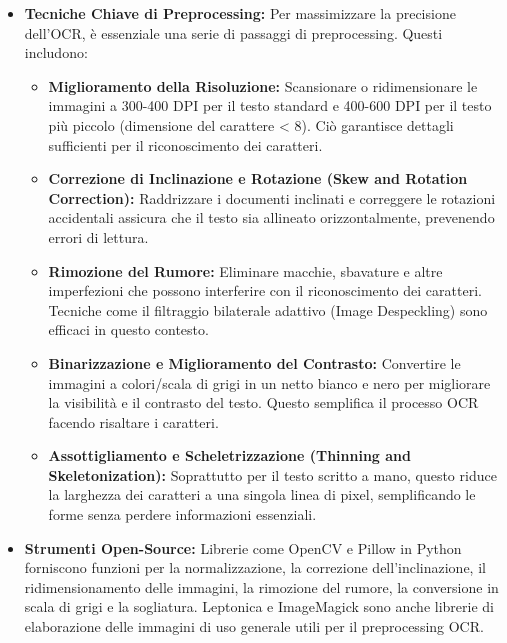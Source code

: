 \documentclass[a4paper, 11pt]{article}
\begin{document}
\begin{itemize}
   \item \textbf{Tecniche Chiave di Preprocessing:} Per massimizzare la precisione dell'OCR, è essenziale una serie di passaggi di preprocessing. Questi includono:
   \begin{itemize}
        \item \textbf{Miglioramento della Risoluzione:} Scansionare o ridimensionare le immagini a 300-400 DPI per il testo standard e 400-600 DPI per il testo più piccolo (dimensione del carattere < 8). \cite{ocr_best_practices} Ciò garantisce dettagli sufficienti per il riconoscimento dei caratteri.
        \item \textbf{Correzione di Inclinazione e Rotazione (Skew and Rotation Correction):} Raddrizzare i documenti inclinati e correggere le rotazioni accidentali assicura che il testo sia allineato orizzontalmente, prevenendo errori di lettura. \cite{conexiom_ocr_problems}
        \item \textbf{Rimozione del Rumore:} Eliminare macchie, sbavature e altre imperfezioni che possono interferire con il riconoscimento dei caratteri. \cite{survey_ocr_preprocessing} Tecniche come il filtraggio bilaterale adattivo (Image Despeckling) sono efficaci in questo contesto. \cite{survey_ocr_preprocessing}
        \item \textbf{Binarizzazione e Miglioramento del Contrasto:} Convertire le immagini a colori/scala di grigi in un netto bianco e nero per migliorare la visibilità e il contrasto del testo. \cite{survey_ocr_preprocessing} Questo semplifica il processo OCR facendo risaltare i caratteri.
        \item \textbf{Assottigliamento e Scheletrizzazione (Thinning and Skeletonization):} Soprattutto per il testo scritto a mano, questo riduce la larghezza dei caratteri a una singola linea di pixel, semplificando le forme senza perdere informazioni essenziali. \cite{docuclipper_ocr_preprocessing}
   \end{itemize}
    \item \textbf{Strumenti Open-Source:} Librerie come OpenCV e Pillow in Python \cite{nextgeninvent_ocr_python} forniscono funzioni per la normalizzazione, la correzione dell'inclinazione, il ridimensionamento delle immagini, la rimozione del rumore, la conversione in scala di grigi e la sogliatura. Leptonica e ImageMagick sono anche librerie di elaborazione delle immagini di uso generale utili per il preprocessing OCR. \cite{survey_ocr_preprocessing}
\end{itemize}
\end{document}
